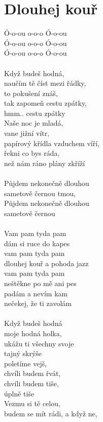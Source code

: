 \section{Dlouhej kouř}
\begin{multicols}{2}
Ó-o-ou o-o-o Ó-o-ou\\
Ó-o-ou o-o-o Ó-o-ou\\
Ó-o-ou o-o-o Ó-o-ou\\
\\
Když budeš hodná,\\
naučím tě číst mezi řádky,\\
to pokušení znáš,\\
tak zapomeň cestu zpátky,\\
hmm.. cestu zpátky\\
Naše noc je mladá,\\
vane jižní vítr,\\
papírový křídla vzduchem víří,\\
řekni co bys ráda,\\
než nám ráno plány zkříží\\
\\
Půjdem nekonečně dlouhou\\
sametově černou tmou,\\
Půjdem nekonečně dlouhou\\
sametově černou\\
\\
Vam pam tyda pam\\
dám si ruce do kapes\\
vam pam tyda pam\\
dlouhej kouř a pohoda jazz\\
vam pam tyda pam\\
neštěkne po mě ani pes\\
padám a nevím kam\\
nečekej, že ti zavolám\\
\\
Když budeš hodná\\
moje hodná holka,\\
ukážu ti všechny svoje\\
tajný skrýše\\
poletíme vejš,\\
chvíli budem řvát,\\
chvíli budem tiše,\\
úplně tiše\\
Vezmu si tě celou,\\
budem se mít rádi, a když ne,\\

\end{multicols}
